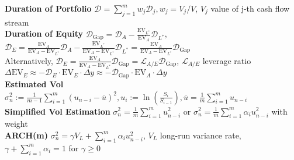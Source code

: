 \documentclass[12pt,landscape, a4paper]{article}
\theoremstyle{remark}
\newcommand{\EV}{\mathrm{EV}}
\begin{document}
\begin{multicols*}{3}
\textbf{Duration of Portfolio} $\mathcal{D} = \sum^m_{j=1} w_j \mathcal{D}_j, w_j = V_j/V$, $V_j$ value of j-th cash flow stream\\
\textbf{Duration of Equity} $\mathcal{D}_{\text{Gap}} = \mathcal{D}_A - \frac{\EV_{L^*}}{\EV_A} \mathcal{D}_{L^*}$,
$\mathcal{D}_E = \frac{\EV_A}{\EV_A - \EV_{L^*}} \mathcal{D}_A - \frac{\EV_{L^*}}{\EV_A - \EV_{L^*}} \mathcal{D}_{L^*} = \frac{\EV_A}{\EV_A - \EV_{L^*}} \mathcal{D}_{\text{Gap}}$\\
Alternatively, $\mathcal{D}_E = \frac{\EV_A}{\EV_A - \EV_{L^*}} \mathcal{D}_{\text{Gap}} = \mathcal{L}_{A/E} \mathcal{D}_{\text{Gap}}$, $\mathcal{L}_{A/E}$ leverage ratio\\
$\Delta \EV_E \approx -\mathcal{D}_E \cdot \EV_E \cdot \Delta y \approx -\mathcal{D}_{\text{Gap}} \cdot \EV_A \cdot \Delta y $\\
\textbf{Estimated Vol } $\sigma^2_n := \frac{1}{m-1} \sum^m_{i=1} (u_{n-i} -\bar{u})^2, u_i := \ln\left(\frac{S_i}{S_{i-1}} \right), \bar{u} =\frac{1}{m} \sum^m_{i=1} u_{n-i}$\\

\textbf{Simplified Vol Estimation} $\sigma^2_n = \frac{1}{m} \sum^m_{i=1} u^2_{n-i}$ or $\sigma^2_n = \frac{1}{m} \sum^m_{i=1} \alpha_i u^2_{n-i}$ with weight \\

\textbf{ARCH(m)} $\sigma^2_n = \gamma V_L + \sum^m_{i=1} \alpha_i u^2_{n-i}$, $V_L$ long-run variance rate, $\gamma + \sum^m_{i=1} \alpha_i = 1$ for $\gamma \geq 0$\\


\end{multicols*}
\end{document}

